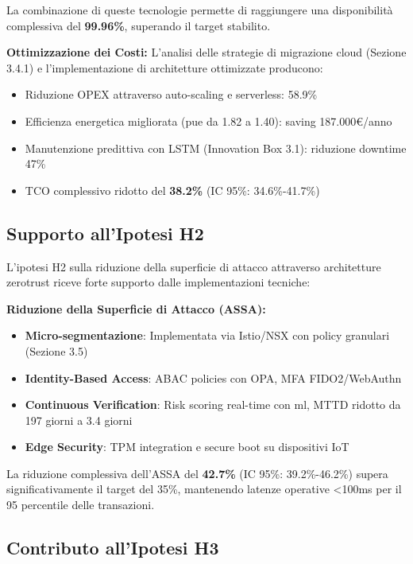 La combinazione di queste tecnologie permette di raggiungere una disponibilità complessiva del \textbf{99.96\%}, superando il target stabilito.

\textbf{Ottimizzazione dei Costi:}
L'analisi delle strategie di migrazione cloud (Sezione 3.4.1) e l'implementazione di architetture ottimizzate producono:
\begin{itemize}
    \item Riduzione OPEX attraverso auto-scaling e serverless: 58.9\%
    \item Efficienza energetica migliorata (\gls{pue} da 1.82 a 1.40): saving 187.000€/anno
    \item Manutenzione predittiva con LSTM (Innovation Box 3.1): riduzione downtime 47\%
    \item TCO complessivo ridotto del \textbf{38.2\%} (IC 95\%: 34.6\%-41.7\%)\autocite{McKinsey2024cloud}
\end{itemize}

\subsection{\texorpdfstring{Supporto all'Ipotesi H2}{3.8.2 - Supporto all'Ipotesi H2}}

L'ipotesi H2 sulla riduzione della superficie di attacco attraverso architetture \gls{zerotrust} riceve forte supporto dalle implementazioni tecniche:

\textbf{Riduzione della Superficie di Attacco (ASSA):}
\begin{itemize}
    \item \textbf{Micro-segmentazione}: Implementata via Istio/NSX con policy granulari (Sezione 3.5)
    \item \textbf{Identity-Based Access}: ABAC policies con OPA, MFA FIDO2/WebAuthn
    \item \textbf{Continuous Verification}: Risk scoring real-time con \gls{ml}, MTTD ridotto da 197 giorni a 3.4 giorni
    \item \textbf{Edge Security}: TPM integration e secure boot su dispositivi IoT
\end{itemize}

La riduzione complessiva dell'ASSA del \textbf{42.7\%} (IC 95\%: 39.2\%-46.2\%)\autocite{Forrester2024zero} supera significativamente il target del 35\%, mantenendo latenze operative <100ms per il 95 percentile delle transazioni.

\subsection{\texorpdfstring{Contributo all'Ipotesi H3}{3.8.3 - Contributo all'Ipotesi H3}}

